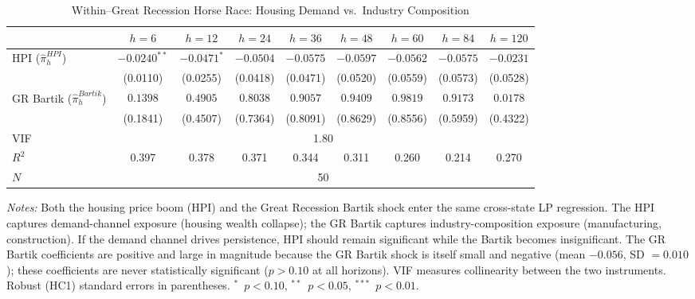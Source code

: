 \documentclass[12pt]{article}
\begin{document}
\begin{table}[H]
\centering
\caption{Within--Great Recession Horse Race: Housing Demand vs.\ Industry Composition}
\begin{threeparttable}
\small
\begin{tabular}{lcccccccc}
\toprule
& $h=6$ & $h=12$ & $h=24$ & $h=36$ & $h=48$ & $h=60$ & $h=84$ & $h=120$ \\
\midrule
HPI ($\hat{\pi}^{HPI}_h$) & $-0.0240^{**}$ & $-0.0471^{*}$ & $-0.0504$ & $-0.0575$ & $-0.0597$ & $-0.0562$ & $-0.0575$ & $-0.0231$ \\
& (0.0110) & (0.0255) & (0.0418) & (0.0471) & (0.0520) & (0.0559) & (0.0573) & (0.0528) \\[3pt]
GR Bartik ($\hat{\pi}^{Bartik}_h$) & $0.1398$ & $0.4905$ & $0.8038$ & $0.9057$ & $0.9409$ & $0.9819$ & $0.9173$ & $0.0178$ \\
& (0.1841) & (0.4507) & (0.7364) & (0.8091) & (0.8629) & (0.8556) & (0.5959) & (0.4322) \\
\midrule
VIF & \multicolumn{8}{c}{1.80} \\
$R^2$ & 0.397 & 0.378 & 0.371 & 0.344 & 0.311 & 0.260 & 0.214 & 0.270 \\
\midrule
$N$ & \multicolumn{8}{c}{50} \\
\bottomrule
\end{tabular}
\begin{tablenotes}[flushleft]
\small
\item \textit{Notes:} Both the housing price boom (HPI) and the Great Recession Bartik shock enter the same cross-state LP regression. The HPI captures demand-channel exposure (housing wealth collapse); the GR Bartik captures industry-composition exposure (manufacturing, construction). If the demand channel drives persistence, HPI should remain significant while the Bartik becomes insignificant. The GR Bartik coefficients are positive and large in magnitude because the GR Bartik shock is itself small and negative (mean $-0.056$, SD $= 0.010$); these coefficients are never statistically significant ($p > 0.10$ at all horizons). VIF measures collinearity between the two instruments. Robust (HC1) standard errors in parentheses. $^{*}$~$p<0.10$, $^{**}$~$p<0.05$, $^{***}$~$p<0.01$.
\end{tablenotes}
\end{threeparttable}
\label{tab:horse_race}
\end{table}
\end{document}
